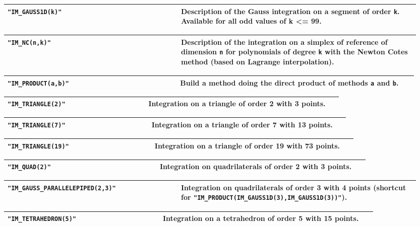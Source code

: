\begin{center} \begin{tabular}{|m{0.4\linewidth}|m{0.55\linewidth}|} \hline
{\tt "IM\_GAUSS1D(k)" } & Description of the Gauss integration on a segment of order {\tt k}. Available for all odd values of k <= 99.\\ \hline
\end{tabular}  
\begin{tabular}{|m{0.4\linewidth}|m{0.55\linewidth}|} \hline
{\tt "IM\_NC(n,k)"} & Description of the integration on a simplex of reference of dimension {\tt n} for polynomials of degree {\tt k} with the Newton Cotes method (based on Lagrange interpolation).\\ \hline
\end{tabular}  
\begin{tabular}{|m{0.4\linewidth}|m{0.55\linewidth}|} \hline
{\tt "IM\_PRODUCT(a,b)"} & Build a method doing the direct product of methods {\tt a} and {\tt b}. \\ \hline
\end{tabular}  
\begin{tabular}{|m{0.4\linewidth}|m{0.55\linewidth}|} \hline
{\tt "IM\_TRIANGLE(2)"} & Integration on a triangle of order 2 with 3 points. \\ \hline
\end{tabular}
\begin{tabular}{|m{0.4\linewidth}|m{0.55\linewidth}|} \hline
{\tt "IM\_TRIANGLE(7)"} & Integration on a triangle of order 7 with 13 points. \\ \hline
\end{tabular} 
\begin{tabular}{|m{0.4\linewidth}|m{0.55\linewidth}|} \hline
{\tt "IM\_TRIANGLE(19)"} & Integration on a triangle of order 19 with 73 points. \\ \hline
\end{tabular} 
\begin{tabular}{|m{0.4\linewidth}|m{0.55\linewidth}|} \hline
{\tt "IM\_QUAD(2)"} & Integration on quadrilaterals of order 2 with 3 points. \\ \hline
\end{tabular}
\begin{tabular}{|m{0.4\linewidth}|m{0.55\linewidth}|} \hline
{\tt "IM\_GAUSS\_PARALLELEPIPED(2,3)"} & Integration on quadrilaterals of order 3 with 4 points (shortcut for {\tt "IM\_PRODUCT(IM\_GAUSS1D(3),IM\_GAUSS1D(3))"}). \\ \hline
\end{tabular}
\begin{tabular}{|m{0.4\linewidth}|m{0.55\linewidth}|} \hline
{\tt "IM\_TETRAHEDRON(5)"} & Integration on a tetrahedron of order 5 with 15 points. \\ \hline
\end{tabular} \end{center}
